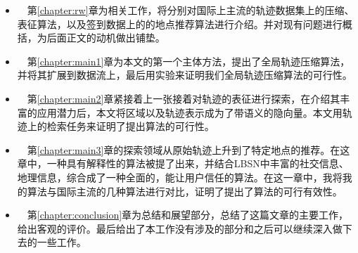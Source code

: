 \vspace{2mm}
\begin{itemize}
  \item ~~第\ref{chapter:rw}章为相关工作，将分别对国际上主流的轨迹数据集上的压缩、表征算法，以及签到数据上的的地点推荐算法进行介绍。并对现有问题进行概括，为后面正文的动机做出铺垫。
  \vspace{1mm}
  \item ~~第\ref{chapter:main1}章为本文的第一个主体方法，提出了全局轨迹压缩算法，并将其扩展到数据流上，最后用实验来证明我们全局轨迹压缩算法的可行性。
  \vspace{1mm}
  \item ~~第\ref{chapter:main2}章紧接着上一张接着对轨迹的表征进行探索，在介绍其丰富的应用潜力后，本文将区域以及轨迹表示成为了带语义的隐向量。本文用轨迹上的检索任务来证明了提出算法的可行性。
  \vspace{1mm}
  \item ~~第\ref{chapter:main3}章的探索领域从原始轨迹上升到了特定地点的推荐。在这章中，一种具有解释性的算法被提了出来，并结合LBSN中丰富的社交信息、地理信息，综合成了一种全面的，能让用户信任的算法。在这一章中，我将我的算法与国际主流的几种算法进行对比，证明了提出了算法的可行有效性。
  \vspace{1mm}
  \item ~~第\ref{chapter:conclusion}章为总结和展望部分，总结了这篇文章的主要工作，给出客观的评价。最后给出了本工作没有涉及的部分和之后可以继续深入做下去的一些工作。
\end{itemize}

\newpage\mbox{}\thispagestyle{empty}\newpage
